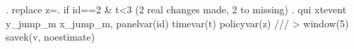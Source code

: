 . replace z=. if id==2 \& t<3
(2 real changes made, 2 to missing)
{\smallskip}
. qui xtevent y_jump_m x_jump_m, panelvar(id) timevar(t) policyvar(z) ///
>  window(5) savek(v, noestimate)
{\smallskip}
